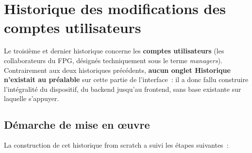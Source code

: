 \section{Historique des modifications des comptes utilisateurs}
\label{sec:historisation-comptes}

Le troisième et dernier historique concerne les \textbf{comptes
utilisateurs} (les collaborateurs du FPG, désignés techniquement sous le
terme \textit{managers}). Contrairement aux deux historiques précédents,
\textbf{aucun onglet Historique n'existait au préalable} sur cette partie
de l'interface~: il a donc fallu construire l'intégralité du dispositif,
du backend jusqu'au frontend, sans base existante sur laquelle s'appuyer.

\subsection{Démarche de mise en œuvre}

La construction de cet historique \og{}from scratch\fg{} a suivi les
étapes suivantes~:


